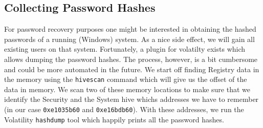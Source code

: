 \documentclass[a4paper,
    11pt,
    normalheadings,
    parindent,
    UKenglish,
    abstracton,
    ]{scrartcl}
\begin{document}
\subsection{Collecting Password Hashes}
For password recovery purposes one might be interested in obtaining the hashed passwords of a running (Windows) system.
As a nice side effect, we will gain all existing users on that system.
Fortunately, a plugin for volatilty exists which allows dumping the password hashes.
The process, however, is a bit cumbersome and could be more automated in the future.
We start off finding Registry data in the memory using the \texttt{hivescan} command which will give us the offset of the data in memory.
We scan two of these memory locations to make sure that we identify the Security and the System hive whichs addresses we have to remember (in our case \texttt{0xe1035b60} and \texttt{0xe16bdb60}).
With these addresses, we run the Volatility \texttt{hashdump} tool which happily prints all the password hashes.
\end{document}
